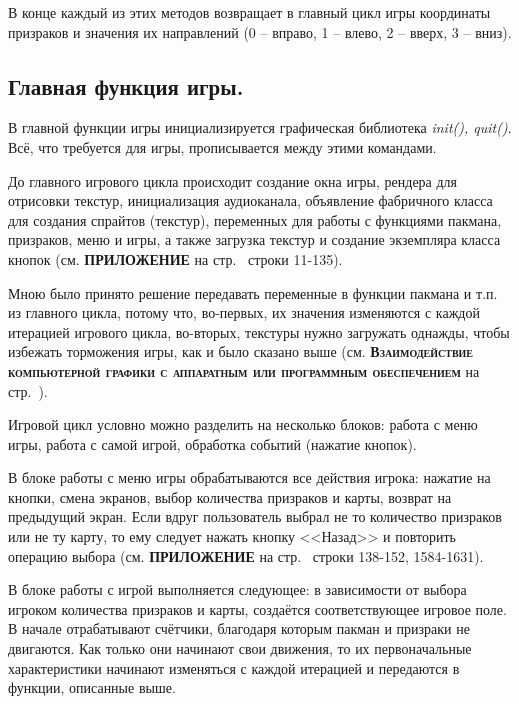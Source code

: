 В конце каждый из этих методов возвращает в главный цикл игры координаты призраков и значения их направлений (0 -- вправо, 1 -- влево, 2 -- вверх, 3 -- вниз).

\subsection{\label{subsec:ch02/sec01/sub07}Главная функция игры.}
В главной функции игры инициализируется графическая библиотека \textit{init(), quit()}. Всё, что требуется для игры, прописывается между этими командами.

До главного игрового цикла происходит создание окна игры, рендера для отрисовки текстур, инициализация аудиоканала, объявление фабричного класса для создания спрайтов (текстур), переменных для работы с функциями пакмана, призраков, меню и игры, а также загрузка текстур и создание экземпляра класса кнопок (см. \textbf{\textsc{ПРИЛОЖЕНИЕ}} на стр.~\pageref{code:main} строки 11-135).

Мною было принято решение передавать переменные в функции пакмана и т.п. из главного цикла, потому что, во-первых, их значения изменяются с каждой итерацией игрового цикла, во-вторых, текстуры нужно загружать однажды, чтобы избежать торможения игры, как и было сказано выше (см. \textbf{\textsc{Взаимодействие компьютерной графики с аппаратным или программным обеспечением}} на стр.~\pageref{subsec:ch02/sec01/sub02}).

Игровой цикл условно можно разделить на несколько блоков: работа с меню игры, работа с самой игрой, обработка событий (нажатие кнопок). 

В блоке работы с меню игры обрабатываются все действия игрока: нажатие на кнопки, смена экранов, выбор количества призраков и карты, возврат на предыдущий экран. Если вдруг пользователь выбрал не то количество призраков или не ту карту, то ему следует нажать кнопку <<Назад>> и повторить операцию выбора (см. \textbf{\textsc{ПРИЛОЖЕНИЕ}} на стр.~\pageref{code:main} строки 138-152, 1584-1631). 

В блоке работы с игрой выполняется следующее: в зависимости от выбора игроком количества призраков и карты, создаётся соответствующее игровое поле. В начале отрабатывают счётчики, благодаря которым пакман и призраки не двигаются. Как только они начинают свои движения, то их первоначальные характеристики начинают изменяться с каждой итерацией и передаются в функции, описанные выше. 

